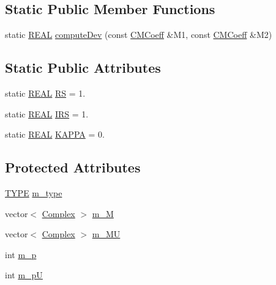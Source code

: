 \subsection*{Static Public Member Functions}
\begin{DoxyCompactItemize}
\item 
static \hyperlink{util_8h_a5821460e95a0800cf9f24c38915cbbde}{R\-E\-A\-L} \hyperlink{classCMCoeff_af24efe3725c507a1919b043a5335d9ff}{compute\-Dev} (const \hyperlink{classCMCoeff}{C\-M\-Coeff} \&M1, const \hyperlink{classCMCoeff}{C\-M\-Coeff} \&M2)
\end{DoxyCompactItemize}
\subsection*{Static Public Attributes}
\begin{DoxyCompactItemize}
\item 
static \hyperlink{util_8h_a5821460e95a0800cf9f24c38915cbbde}{R\-E\-A\-L} \hyperlink{classCMCoeff_a512caa3ff1994cbde85011489b8f34ce}{R\-S} = 1.
\item 
static \hyperlink{util_8h_a5821460e95a0800cf9f24c38915cbbde}{R\-E\-A\-L} \hyperlink{classCMCoeff_a7e893ff6deb29f85472663fffd995f42}{I\-R\-S} = 1.
\item 
static \hyperlink{util_8h_a5821460e95a0800cf9f24c38915cbbde}{R\-E\-A\-L} \hyperlink{classCMCoeff_a468f6af1ba4ddbe13561217488c87b40}{K\-A\-P\-P\-A} = 0.
\end{DoxyCompactItemize}
\subsection*{Protected Attributes}
\begin{DoxyCompactItemize}
\item 
\hyperlink{classCMCoeff_a0b490eeb5ba86bc1a95ea1c3b2946478}{T\-Y\-P\-E} \hyperlink{classCMCoeff_afe0cd2c61d33f32a058302fb53c33ccf}{m\-\_\-type}
\item 
vector$<$ \hyperlink{util_8h_a0ef19d29521fc1e3356ea268ba175cfc}{Complex} $>$ \hyperlink{classCMCoeff_a15347641cc66b95ff56bea89f4585edf}{m\-\_\-\-M}
\item 
vector$<$ \hyperlink{util_8h_a0ef19d29521fc1e3356ea268ba175cfc}{Complex} $>$ \hyperlink{classCMCoeff_a2fc4617b2a37d2ca033aea2f5e02b5de}{m\-\_\-\-M\-U}
\item 
int \hyperlink{classCMCoeff_adf49f0bd55b7c496b887f547695aba38}{m\-\_\-p}
\item 
int \hyperlink{classCMCoeff_ac00d5938d669575bf71826ee725ccf46}{m\-\_\-p\-U}
\end{DoxyCompactItemize}
